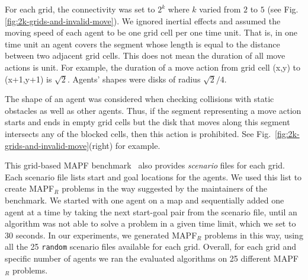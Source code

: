 \documentclass[review]{elsarticle}
\newcommand\konstantin[1]{\nb{\textbf{Konstantin:}}{red}{#1}}
\newcommand{\mapfr}{\ac{MAPF}$_R$\xspace}
\newcommand{\mapf}{\ac{MAPF}\xspace}
\begin{document}



For each grid, the connectivity was set to $2^k$ where $k$ varied from $2$ to $5$ (see Fig.\ref{fig:2k-grids-and-invalid-move}). We ignored inertial effects and assumed the moving speed of each agent to be one grid cell per one time unit. That is, in one time unit an agent covers the segment whose length is equal to the distance between two adjacent grid cells. 
This does not mean the duration of all move actions is unit. 
For example, the duration of a move action from grid cell (x,y) to (x+1,y+1) is $\sqrt{2}$. 
Agents' shapes were disks of radius $\sqrt{2}/{4}$. %

The shape of an agent was considered when checking collisions with static obstacles as well as other agents. Thus, if the segment representing a move action starts and ends in empty grid cells but the disk that moves along this segment intersects any of the blocked cells, then this action is prohibited. See Fig.~\ref{fig:2k-grids-and-invalid-move}(right) for example.


This grid-based \mapf benchmark~\cite{stern2019mapf} also provides \emph{scenario} files for each grid. 
Each scenario file lists start and goal locations for the agents. We used this list to create \mapfr problems in the way suggested by the maintainers of the benchmark. We started with one agent on a map and sequentially added one agent at a time by taking the next start-goal pair from the scenario file, until an algorithm was not able to solve a problem in a given time limit, which we set to 30 seconds. 
In our experiments, we generated \mapfr problems in this way, using all the 25 \texttt{random} scenario files available for each grid. 
Overall, for each grid and specific number of agents we ran the evaluated algorithms on 25 different \mapfr problems.
\end{document}
